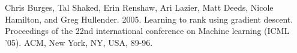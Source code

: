 \begin{thebibliography}{999}
 Chris Burges, Tal Shaked, Erin Renshaw, Ari Lazier, Matt Deeds, Nicole Hamilton, and Greg Hullender. 2005. Learning to rank using gradient descent. Proceedings of the 22nd international conference on Machine learning (ICML '05). ACM, New York, NY, USA, 89-96. 

\end{thebibliography}
